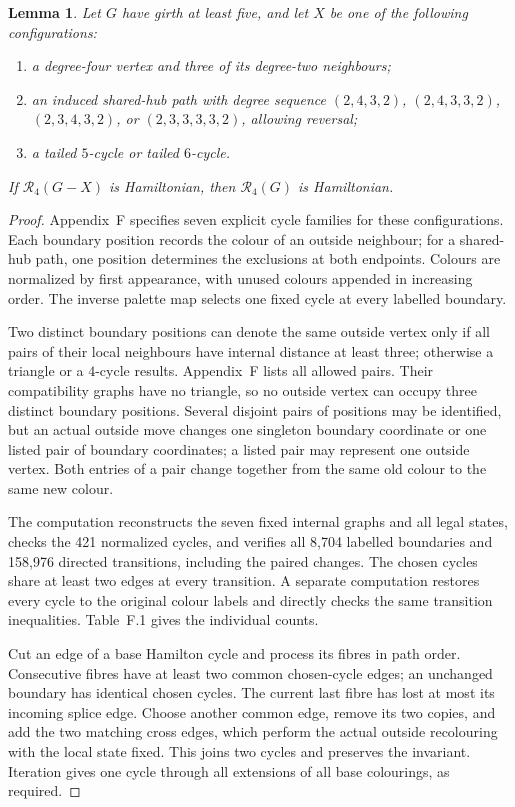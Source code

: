 \documentclass[11pt]{article}
\newtheorem{lemma}[theorem]{Lemma}
\theoremstyle{remark}
\newcommand{\R}{\mathcal R}
\numberwithin{equation}{section}
\numberwithin{table}{section}
\begin{document}
\begin{lemma}\label{lem:further-degree-two}
Let $G$ have girth at least five, and let $X$ be one of the following
configurations:
\begin{enumerate}
\item a degree-four vertex and three of its degree-two neighbours;
\item an induced shared-hub path with degree sequence
$(2,4,3,2)$, $(2,4,3,3,2)$, $(2,3,4,3,2)$, or
$(2,3,3,3,3,2)$, allowing reversal;
\item a tailed $5$-cycle or tailed $6$-cycle.
\end{enumerate}
If $\R_4(G-X)$ is Hamiltonian, then $\R_4(G)$ is Hamiltonian.
\end{lemma}
\begin{proof}
Appendix~F specifies seven explicit cycle families for these
configurations. Each boundary position records the colour of an outside
neighbour; for a shared-hub path, one position determines the exclusions
at both endpoints. Colours are normalized by first
appearance, with unused colours appended in increasing order. The inverse
palette map selects one fixed cycle at every labelled boundary.

Two distinct boundary positions can denote the same outside vertex only if all
pairs of their local neighbours have internal distance at least three;
otherwise a triangle or a $4$-cycle results. Appendix~F lists all allowed
pairs. Their compatibility graphs have no triangle, so no outside vertex can occupy three distinct
boundary positions. Several disjoint pairs of positions may be identified, but an actual
outside move changes one singleton boundary coordinate or one listed pair of
boundary coordinates; a listed pair may represent one outside
vertex. Both entries of a pair change together from the same old colour to the
same new colour.

The computation reconstructs the seven fixed internal graphs and all legal
states, checks the 421 normalized cycles, and verifies all 8,704 labelled
boundaries and 158,976 directed transitions, including the paired changes.
The chosen cycles share at least two edges at every transition. A separate
computation restores every cycle to the original colour labels and directly checks
the same transition inequalities. Table~F.1 gives the individual counts.

Cut an edge of a base Hamilton cycle and process its fibres in path
order. Consecutive fibres have at least two common chosen-cycle edges;
an unchanged boundary has identical chosen cycles. The current last fibre
has lost at most its incoming splice edge. Choose another common edge,
remove its two copies, and add the two matching cross edges, which perform
the actual outside recolouring with the local state fixed. This joins two
cycles and preserves the invariant. Iteration gives one cycle through all
extensions of all base colourings, as required.
\end{proof}
\end{document}
